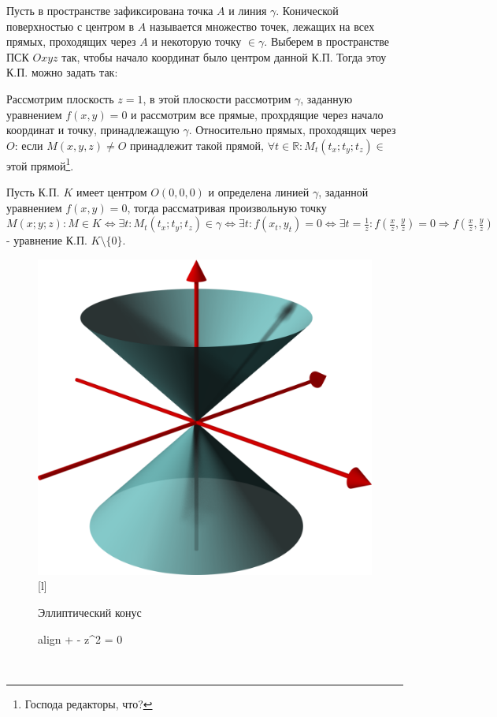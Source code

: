\documentclass[oneside]{book}
\newcommand{\boxedeq}[2]{\begin{empheq}[box={\fboxsep=6pt\fbox}]{align}\label{#1}#2\end{empheq}}
\begin{document}
\begin{enumerate}
\begin{itemize}
\begin{enumerate}
Пусть в пространстве зафиксирована точка $A$ и линия $\gamma$. Конической поверхностью с центром в $A$ называется множество точек, лежащих на всех прямых, проходящих
через $A$ и некоторую точку $\in \gamma$. Выберем в пространстве ПСК $Oxyz$  так, чтобы начало координат было центром данной К.П. Тогда этоу К.П. можно задать так:
\par Рассмотрим плоскость $z = 1$, в этой плоскости рассмотрим $\gamma$, заданную уравнением $f(x, y) = 0$ и рассмотрим все прямые, прохрдящие через начало
координат и точку, принадлежащую $\gamma$. Относительно прямых,  проходящих через $O$: если $M(x, y, z) \neq O$ принадлежит такой прямой, $\forall t \in \mathbb{R}: M_t(t_x; t_y; t_z) \in$ этой прямой\footnote{Господа редакторы, что?}.
\par Пусть К.П. $K$ имеет центром $O(0,0,0)$ и определена линией $\gamma$, заданной уравнением $f(x, y) = 0$, тогда рассматривая произвольную точку $M(x; y; z): M \in K \Leftrightarrow \exists t: M_t(t_x; t_y; t_z) \in \gamma \Leftrightarrow \exists t: f(x_t, y_t) = 0 \Leftrightarrow \exists t = \frac{1}{z}: f(\frac{x}{z}, \frac{y}{z}) = 0 \Rightarrow f(\frac{x}{z}, \frac{y}{z})$ - уравнение К.П. $K \setminus \{0\}$.    

\begin{figure}
        \centering
        \includegraphics[scale=0.05]{./pics/jiji.png}
[l]{Эллиптический конус \\ \boxedeq{eq:*}{ +  - z^2 = 0}}
\end{figure} \\


\end{enumerate}
\end{itemize}
\end{enumerate}
\end{document}
